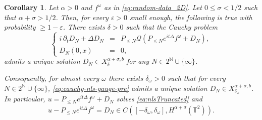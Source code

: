 \documentclass[11pt, xcolor = dvipsnames,reqno
]{amsart}
\newtheorem{coro}[thm]{Corollary}
\theoremstyle{definition}
\theoremstyle{remark}
\begin{document}
\begin{coro}\label{coro:LWP}
    Let $\alpha > 0$ and $f^{\omega}$ as in \eqref{eq:random-data_2D}. 
    Let $0 \leq \sigma < 1/2$ such that $\alpha + \sigma > 1/2$. Then, for every $\varepsilon > 0$ small enough, the following is true with probability $\geq 1 - \varepsilon$. There exists $\delta > 0$ such that the Cauchy problem
    \begin{equation}\label{eq:cauchy-nls-gauge-pre}
    \left\{
    \begin{array}{rcl}
         i\, \partial_t D_N +  \Delta D_N & = & P_{\leq N}\mathcal{Q}( P_{\leq N} e^{it\Delta} f^{\omega} + D_N), \\
         D_N(0,x) & = & 0,
    \end{array}
    \right.
        \end{equation}
    admits a unique solution $D_N \in X^{\alpha + \sigma, b}_\delta$ for any $N \in 2^{\mathbb N} \cup \{\infty\}$.

    Consequently, for almost every $\omega$ there exists $\delta_\omega > 0$ such that for every $N \in 2^{\mathbb N} \cup \{\infty \}$, \eqref{eq:cauchy-nls-gauge-pre} admits a unique solution $D_N \in X^{\alpha + \sigma,  b}_{\delta_\omega}$. 
        In particular, $u = P_{\leq N} e^{it\Delta}f^\omega + D_N$ solves \eqref{eq:nlsTruncated} and 
        \begin{align}\label{eq:Hs-nsmoothing}
            u - P_{\leq N}e^{it\Delta} f^{\omega} = D_N \in C([-\delta_\omega,\delta_\omega],H^{\alpha + \sigma}(\mathbb T^2)).
        \end{align}
\end{coro}
\end{document}
